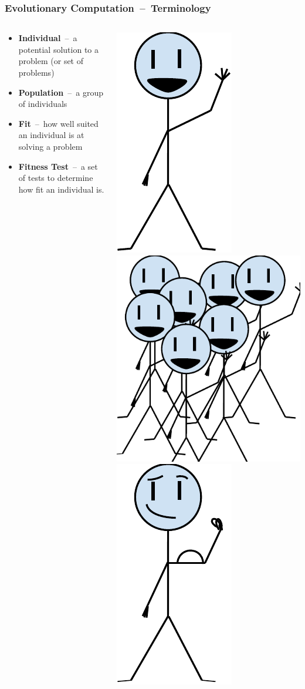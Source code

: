 \documentclass{beamer}
\newcommand{\linespace}{\vskip 0.25cm}
\begin{document}
\begin{frame}
	\frametitle{Evolutionary Computation~--~Terminology}
	\begin{columns}
		\begin{column}{0.7\textwidth}
			\begin{itemize}
				\item \textbf{Individual}~--~a potential solution to a problem (or set of problems)
				\linespace
				\linespace
				\linespace
				\pause
				\item \textbf{Population}~--~a group of individuals
				\linespace
				\linespace
				\linespace
				\pause
				\item \textbf{Fit}~--~how well suited an individual is at solving a problem
				\linespace
				\linespace
				\linespace
				\pause
				\item \textbf{Fitness Test}~--~a set of tests to determine how fit an individual is.
			\end{itemize}
		\end{column}
		\begin{column}{0.3\textwidth}
			\pause[0]
			\includegraphics[width=.25\textwidth]{Illustrations/individual.PDF}
			\linespace
			\pause[2]
			\includegraphics[height=.4\textwidth]{Illustrations/population.PDF}
			\linespace
			\pause[3]
			\includegraphics[height=.5\textwidth]{Illustrations/fit.PDF}

\end{column}
\end{columns}
\end{frame}
\end{document}

